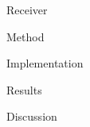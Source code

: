 \newpage
\begin{section}{Receiver}

    \begin{subsection}{Method}

    \end{subsection}
    \begin{subsection}{Implementation}

    \end{subsection}
    \begin{subsection}{Results}

    \end{subsection}
    \begin{subsection}{Discussion}

    \end{subsection}

\end{section}